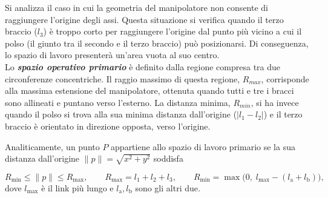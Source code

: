 \documentclass[11pt, a4paper]{article}
\begin{document}
\begin{par}
\begin{flushleft}
Si analizza il caso in cui la geometria del manipolatore non consente di raggiungere l'origine degli assi. Questa situazione si verifica quando il terzo braccio ($l_3$) è troppo corto per raggiungere l'origine dal punto più vicino a cui il polso (il giunto tra il secondo e il terzo braccio) può posizionarsi. Di conseguenza, lo spazio di lavoro presenterà un'area vuota al suo centro.\\
Lo \textit{\textbf{spazio operativo primario}} è definito dalla regione compresa tra due circonferenze concentriche. Il raggio massimo di questa regione, $R_{max}$, corrisponde alla massima estensione del manipolatore, ottenuta quando tutti e tre i bracci sono allineati e puntano verso l'esterno. La distanza minima, $R_{min}$, si ha invece quando il polso si trova alla sua minima distanza dall'origine ($|l_1 -l_2 |$) e il terzo braccio è orientato in direzione opposta, verso l'origine.

Analiticamente, un punto $P$ appartiene allo spazio di lavoro primario se la sua distanza
dall'origine $\|p\|=\sqrt{x^2+y^2}$ soddisfa
\end{flushleft}
\end{par}
\[
    R_{\min} \le \|p\| \le R_{\max},
    \qquad
    R_{\max} = l_1 + l_2 + l_3 ,
    \qquad
    R_{\min} = \max\big(0,\; l_{\max} - (l_{\mathrm{a}} + l_{\mathrm{b}})\big),
\]
dove $l_{\max}$ è il link più lungo e $l_{\mathrm{a}}, l_{\mathrm{b}}$ sono gli altri due.
\end{document}

